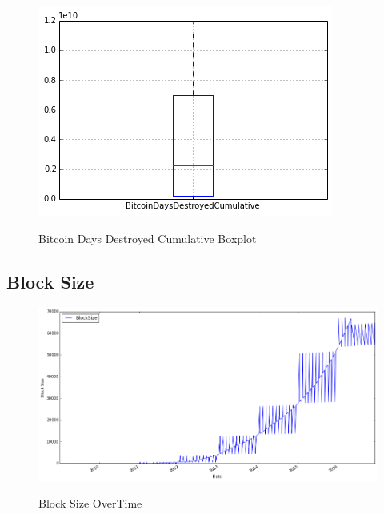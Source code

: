 \begin{figure}[bth]
  \myfloatalign
  {\includegraphics[width=1\linewidth]
    {gfx/bitcoin-days-destroyed-cumulative-boxplot}}
  \caption{Bitcoin Days Destroyed Cumulative Boxplot}
  \label{fig:bitcoin-days-destroyed-cumulative-boxplot}
\end{figure}

\clearpage

\subsection{Block Size}
\label{sec:block-size}

\begin{figure}[bth]
  \myfloatalign
  {\includegraphics[width=1\linewidth]
    {gfx/block-size-over-time}}
  \caption{Block Size OverTime}
  \label{fig:block-size-over-time}
\end{figure}

